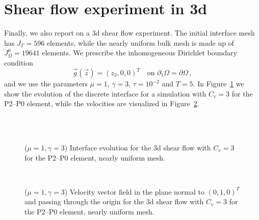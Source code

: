 \section{Shear flow experiment in 3d}\label{sec:stokes_3d_shear}
Finally, we also report on a 3d shear flow experiment. The initial interface
mesh has $J_\Gamma = 596$ elements, while the nearly uniform bulk mesh is made
up of $J_\Omega^0 = 19641$ elements. We prescribe the inhomogeneous Dirichlet
boundary condition
\begin{equation*}
\vec g(\vec z)=(z_3,0,0)^T\quad \mbox{on }\partial_1\Omega=\partial\Omega\,,
\end{equation*}
and we use the parameters $\mu=1$, $\gamma=3$, $\tau=10^{-2}$ and $T=5$.
In Figure~\ref{fig:shear_3d} we show the evolution of the discrete interface
for a simulation with $C_v=3$ for the P2--P0 element, while the velocities
are visualized in Figure~\ref{fig:shear_3d_velocity}.
\begin{figure}[htbp]
\centering
{}\\
\\
\caption[Stokes 3d shear flow interface]
{($\mu=1,\gamma=3$) Interface evolution for the 3d shear flow with $C_v=3$ for
the P2--P0 element, nearly uniform mesh.}
\label{fig:shear_3d}
\end{figure}
\begin{figure}[htbp]
\centering
{}
\\
\caption[Stokes 3d shear flow velocity]
{($\mu=1,\gamma=3$) Velocity vector field in the plane normal to $(0,1,0)^T$
and passing through the origin for the 3d shear flow with $C_v=3$ for the
P2--P0 element, nearly uniform mesh.}
\label{fig:shear_3d_velocity}
\end{figure}

